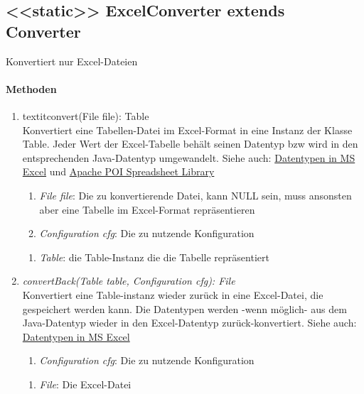 \subsection{<<static>> ExcelConverter extends Converter}
Konvertiert nur Excel-Dateien \\

\paragraph{Methoden}
\begin{enumerate}[+]
	\item textit{convert(File file): Table} \\
	Konvertiert eine Tabellen-Datei im Excel-Format in eine Instanz der Klasse Table.
	Jeder Wert der Excel-Tabelle behält seinen Datentyp bzw wird in den entsprechenden Java-Datentyp umgewandelt.
	Siehe auch: \href{https://support.office.com/en-us/article/data-types-in-data-models-e2388f62-6122-4e2b-bcad-053e3da9ba90#__toc327893213}{Datentypen in MS Excel} und 
	\href{http://poi.apache.org/spreadsheet/}{Apache POI Spreadsheet Library}	
	\begin{enumerate}[$\bullet$]
		\item \textit{File file}: Die zu konvertierende Datei, kann NULL sein, muss ansonsten aber eine Tabelle im Excel-Format repräsentieren
		\item \textit{Configuration cfg}: Die zu nutzende Konfiguration
	\end{enumerate}
	\vspace{-0.2cm}
	\begin{enumerate}[$\circ$]
		\item \textit{Table}: die Table-Instanz die die Tabelle repräsentiert
	\end{enumerate}
	
	\item \textit{convertBack(Table table, Configuration cfg): File} \\
	Konvertiert eine Table-instanz wieder zurück in eine Excel-Datei, die gespeichert werden kann.
	Die Datentypen werden -wenn möglich- aus dem Java-Datentyp wieder in den Excel-Datentyp zurück-konvertiert.
	Siehe auch: \href{https://support.office.com/en-us/article/data-types-in-data-models-e2388f62-6122-4e2b-bcad-053e3da9ba90#__toc327893213}{Datentypen in MS Excel}
	\begin{enumerate}[$\bullet$]
		\textit{Table table}: Die zu konvertierende Table-Instanz
		\item \textit{Configuration cfg}: Die zu nutzende Konfiguration
	\end{enumerate}
	\vspace{-0.2cm}
	\begin{enumerate}[$\circ$]
		\item \textit{File}: Die Excel-Datei
	\end{enumerate}
\end{enumerate}
